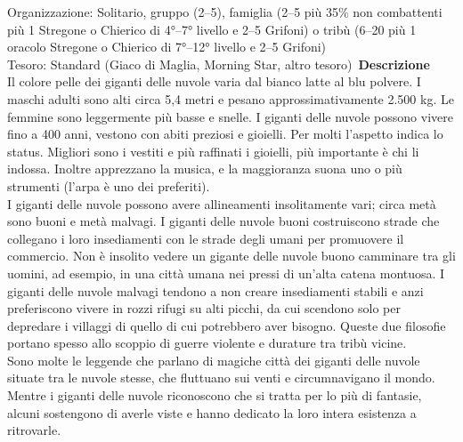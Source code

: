 \begin{multicols}{2}
Organizzazione: Solitario, gruppo (2–5), famiglia (2–5 più 35\% non combattenti più 1 Stregone o Chierico di 4°–7° livello e 2–5 Grifoni) o tribù (6–20 più 1 oracolo Stregone o Chierico di 7°–12° livello e 2–5 Grifoni)\\
Tesoro: Standard (Giaco di Maglia, Morning Star, altro tesoro)\
\textbf{Descrizione}\\
Il colore pelle dei giganti delle nuvole varia dal bianco latte al blu polvere. I maschi adulti sono alti circa 5,4 metri e pesano approssimativamente 2.500 kg. Le femmine sono leggermente più basse e snelle. I giganti delle nuvole possono vivere fino a 400 anni, vestono con abiti preziosi e gioielli. Per molti l’aspetto indica lo status. Migliori sono i vestiti e più raffinati i gioielli, più importante è chi li indossa. Inoltre apprezzano la musica, e la maggioranza suona uno o più strumenti (l’arpa è uno dei preferiti).\\

I giganti delle nuvole possono avere allineamenti insolitamente vari; circa metà sono buoni e metà malvagi. I giganti delle nuvole buoni costruiscono strade che collegano i loro insediamenti con le strade degli umani per promuovere il commercio. Non è insolito vedere un gigante delle nuvole buono camminare tra gli uomini, ad esempio, in una città umana nei pressi di un’alta catena montuosa. I giganti delle nuvole malvagi tendono a non creare insediamenti stabili e anzi preferiscono vivere in rozzi rifugi su alti picchi, da cui scendono solo per depredare i villaggi di quello di cui potrebbero aver bisogno. Queste due filosofie portano spesso allo scoppio di guerre violente e durature tra tribù vicine.\\

Sono molte le leggende che parlano di magiche città dei giganti delle nuvole situate tra le nuvole stesse, che fluttuano sui venti e circumnavigano il mondo. Mentre i giganti delle nuvole riconoscono che si tratta per lo più di fantasie, alcuni sostengono di averle viste e hanno dedicato la loro intera esistenza a ritrovarle.\\


\end{multicols}
